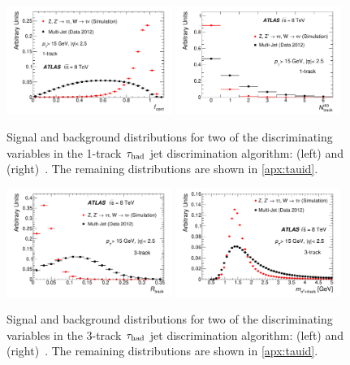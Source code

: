 \begin{figure}[tp]
  \centering
  \includegraphics[width=0.48\textwidth]{figures/PERF-2013-06/fig_02a}
  \includegraphics[width=0.48\textwidth]{figures/PERF-2013-06/fig_02b}
  \caption{Signal and background distributions for two of the discriminating variables in the 1-track $\tau_\text{had}$ jet discrimination algorithm: \centEnergyFrac{} (left) and \numIsoTrack{} (right)~\cite{PERF-2013-06}. The remaining distributions are shown in \cref{apx:tauid}.}
  \label{fig:taus-id1p}
\end{figure}

\begin{figure}[tp]
  \centering
  \includegraphics[width=0.48\textwidth]{figures/PERF-2013-06/fig_03a}
  \includegraphics[width=0.48\textwidth]{figures/PERF-2013-06/fig_03b}
  \caption{Signal and background distributions for two of the discriminating variables in the 3-track $\tau_\text{had}$ jet discrimination algorithm: \trkAvgDist{} (left) and \massTrkPizeroSys{} (right)~\cite{PERF-2013-06}. The remaining distributions are shown in \cref{apx:tauid}.}
  \label{fig:taus-id3p}
\end{figure}

